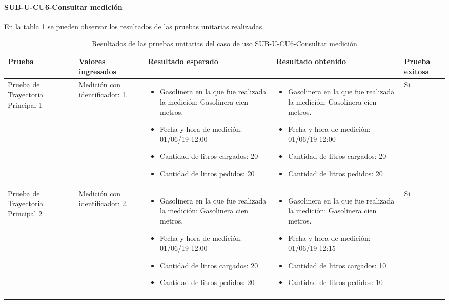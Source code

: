 \paragraph{SUB-U-CU6-Consultar medición}\label{SUB-U-CU6:Pruebas}
En la tabla \ref{pruebas_unitarias_sub-u-cu6} se pueden observar los resultados de las pruebas unitarias realizadas.
\begin{longtable}{|M{2cm}| M{4.5cm}|M{3cm}|M{3cm}|M{1.5cm}|}
	\hline
	\textbf{Prueba} & \textbf{Valores ingresados} & \textbf{Resultado esperado} & \textbf{Resultado obtenido} & \textbf{Prueba exitosa} \\ \hline
	Prueba de Trayectoria Principal 1 & Medición con identificador: 1.
	& 
	\begin{itemize}
		\item Gasolinera en la que fue realizada la medición: Gasolinera cien metros.
		\item Fecha y hora de medición: 01/06/19 12:00
		\item Cantidad de litros cargados: 20
		\item Cantidad de litros pedidos: 20
	\end{itemize}
	&
	\begin{itemize}
		\item Gasolinera en la que fue realizada la medición: Gasolinera cien metros.
		\item Fecha y hora de medición: 01/06/19 12:00
		\item Cantidad de litros cargados: 20
		\item Cantidad de litros pedidos: 20
	\end{itemize}
	& Si \\ \hline

	Prueba de Trayectoria Principal 2 & Medición con identificador: 2.
	& 
	\begin{itemize}
		\item Gasolinera en la que fue realizada la medición: Gasolinera cien metros.
		\item Fecha y hora de medición: 01/06/19 12:00
		\item Cantidad de litros cargados: 20
		\item Cantidad de litros pedidos: 20
	\end{itemize}
	&
	\begin{itemize}
		\item Gasolinera en la que fue realizada la medición: Gasolinera cien metros.
		\item Fecha y hora de medición: 01/06/19 12:15
		\item Cantidad de litros cargados: 10
		\item Cantidad de litros pedidos: 10
	\end{itemize}
	& Si \\ \hline

	\caption{Resultados de las pruebas unitarias del caso de uso SUB-U-CU6-Consultar medición}
	\label{pruebas_unitarias_sub-u-cu6}
\end{longtable}